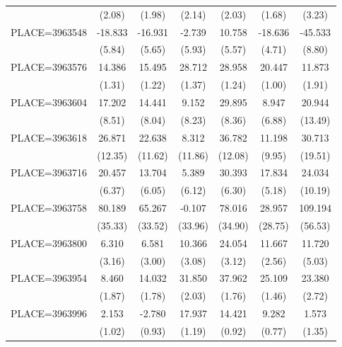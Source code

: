 {\begin{tabular}{l*{6}{c}}
                    &      (2.08)&      (1.98)&      (2.14)&      (2.03)&      (1.68)&      (3.23)\\
PLACE=3963548       &     -18.833&     -16.931&      -2.739&      10.758&     -18.636&     -45.533\\
                    &      (5.84)&      (5.65)&      (5.93)&      (5.57)&      (4.71)&      (8.80)\\
PLACE=3963576       &      14.386&      15.495&      28.712&      28.958&      20.447&      11.873\\
                    &      (1.31)&      (1.22)&      (1.37)&      (1.24)&      (1.00)&      (1.91)\\
PLACE=3963604       &      17.202&      14.441&       9.152&      29.895&       8.947&      20.944\\
                    &      (8.51)&      (8.04)&      (8.23)&      (8.36)&      (6.88)&     (13.49)\\
PLACE=3963618       &      26.871&      22.638&       8.312&      36.782&      11.198&      30.713\\
                    &     (12.35)&     (11.62)&     (11.86)&     (12.08)&      (9.95)&     (19.51)\\
PLACE=3963716       &      20.457&      13.704&       5.389&      30.393&      17.834&      24.034\\
                    &      (6.37)&      (6.05)&      (6.12)&      (6.30)&      (5.18)&     (10.19)\\
PLACE=3963758       &      80.189&      65.267&      -0.107&      78.016&      28.957&     109.194\\
                    &     (35.33)&     (33.52)&     (33.96)&     (34.90)&     (28.75)&     (56.53)\\
PLACE=3963800       &       6.310&       6.581&      10.366&      24.054&      11.667&      11.720\\
                    &      (3.16)&      (3.00)&      (3.08)&      (3.12)&      (2.56)&      (5.03)\\
PLACE=3963954       &       8.460&      14.032&      31.850&      37.962&      25.109&      23.380\\
                    &      (1.87)&      (1.78)&      (2.03)&      (1.76)&      (1.46)&      (2.72)\\
PLACE=3963996       &       2.153&      -2.780&      17.937&      14.421&       9.282&       1.573\\
                    &      (1.02)&      (0.93)&      (1.19)&      (0.92)&      (0.77)&      (1.35)\\

\end{tabular}}
